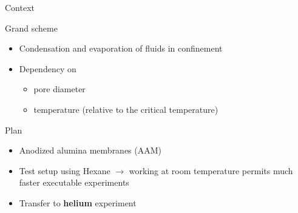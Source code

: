 \documentclass[../defence.tex]{subfiles}
\begin{document}
  \begin{frame}{Context}
    \begin{block}{Grand scheme}

      \begin{itemize}
        \item Condensation and evaporation of fluids in confinement
        \pause

        \item Dependency on
          \begin{itemize}
            \item pore diameter
            \item temperature (relative to the critical temperature)
          \end{itemize}
      \end{itemize}
    \end{block}
    \pause

    \begin{block}{Plan}
      \begin{itemize}
        \pause
        \item Anodized alumina membranes (AAM)
        \pause
        \item Test setup using Hexane $\rightarrow$ working at room temperature permits much faster executable experiments
        \pause
        \item Transfer to \textbf{helium} experiment
      \end{itemize}
    \end{block}
  \end{frame}
\end{document}
